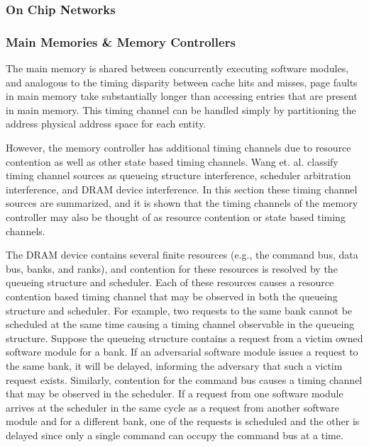 \subsubsection{On Chip Networks}
\subsubsection{Main Memories \& Memory Controllers}
The main memory is shared between concurrently executing software modules, and 
analogous to the timing disparity between cache hits and misses, page faults in 
main memory take substantially longer than accessing entries that are present 
in main memory. This timing channel can be handled simply by partitioning the 
address physical address space for each entity.

However, the memory controller has additional 
timing channels due to resource contention as well as other state based timing 
channels. Wang et. al. classify timing channel sources as queueing structure 
interference, scheduler arbitration interference, and DRAM device interference.  
In this section these timing channel sources are summarized, and it is shown 
that the timing channels of the memory controller may also be thought of as 
resource contention or state based timing channels.

The DRAM device contains several finite resources (e.g., the command bus, data
bus, banks, and ranks), and contention for these resources is resolved by the 
queueing structure and scheduler. Each of these resources causes a resource 
contention based timing channel that may be observed in both the queueing 
structure and scheduler. For example, two requests to the same bank cannot
be scheduled at the same time causing a timing channel observable in the 
queueing structure. Suppose the queueing structure contains a request from a 
victim owned software module for a bank. If an adversarial software module 
issues a request to the same bank, it will be delayed, informing the adversary 
that such a victim request exists.  Similarly, contention for the command bus 
causes a timing channel that may be observed in the scheduler. If a request 
from one software module arrives at the scheduler in the same cycle as a 
request from another software module and for a different bank, one of the 
requests is scheduled and the other is delayed since only a single command can 
occupy the command bus at a time.

